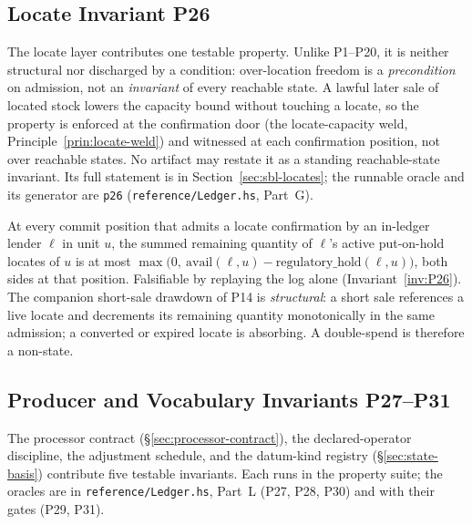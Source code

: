 \subsection{Locate Invariant P26}
\label{sec:invariants-locate}

The locate layer contributes one testable property. Unlike P1--P20, it is neither structural nor discharged by a condition: over-location freedom is a \emph{precondition} on admission, not an \emph{invariant} of every reachable state. A lawful later sale of located stock lowers the capacity bound without touching a locate, so the property is enforced at the confirmation door (the locate-capacity weld, Principle~\ref{prin:locate-weld}) and witnessed at each confirmation position, not over reachable states. No artifact may restate it as a standing reachable-state invariant. Its full statement is in Section~\ref{sec:sbl-locates}; the runnable oracle and its generator are \texttt{p26} (\texttt{reference/Ledger.hs}, Part~G).

\begin{description}[leftmargin=3.2em,style=nextline]
\item[P26 Locate-capacity admission]\label{inv:P26-hub} At every commit position that admits a locate confirmation by an in-ledger lender $\ell$ in unit $u$, the summed remaining quantity of $\ell$'s active put-on-hold locates of $u$ is at most $\max\!\bigl(0,\ \mathrm{avail}(\ell,u)-\mathrm{regulatory\_hold}(\ell,u)\bigr)$, both sides at that position. Falsifiable by replaying the log alone (Invariant~\ref{inv:P26}). The companion short-sale drawdown of P14 is \emph{structural}: a short sale references a live locate and decrements its remaining quantity monotonically in the same admission; a converted or expired locate is absorbing. A double-spend is therefore a non-state.
\end{description}

\subsection{Producer and Vocabulary Invariants P27--P31}
\label{sec:invariants-producer}

The processor contract (\S\ref{sec:processor-contract}), the declared-operator discipline, the adjustment schedule, and the datum-kind registry (\S\ref{sec:state-basis}) contribute five testable invariants. Each runs in the property suite; the oracles are in \texttt{reference/Ledger.hs}, Part~L (P27, P28, P30) and with their gates (P29, P31).

